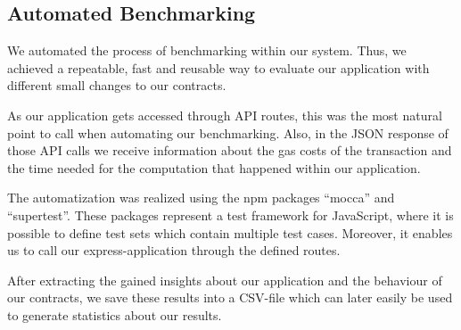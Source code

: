 \subsection{Automated Benchmarking}
We automated the process of benchmarking within our system. 
Thus, we achieved a repeatable, fast and reusable way to evaluate our application with different small changes to our contracts.

As our application gets accessed through API routes, this was the most natural point to call when automating our benchmarking. 
Also, in the JSON response of those API calls we receive information about the gas costs of the transaction and the time needed for the computation that happened within our application.

The automatization was realized using the npm packages ``mocca'' and ``supertest''. 
These packages represent a test framework for JavaScript, where it is possible to define test sets which contain multiple test cases.
 Moreover, it enables us to call our express-application through the defined routes.

After extracting the gained insights about our application and the behaviour of our contracts, we save these results into a CSV-file which can later easily be used to generate statistics about our results.
